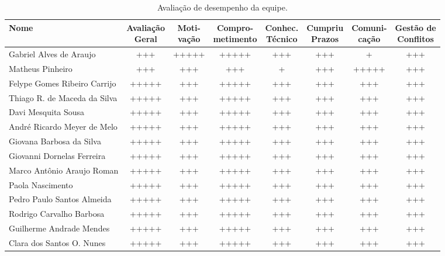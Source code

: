 \begin{landscape}
\begin{table}[htpb]
\centering
\small %
\caption{Avaliação de desempenho da equipe.}
\label{tab:avaliacao_equipe}
\begin{tabular}{|l|c|c|c|c|c|c|c|}
\hline
\textbf{Nome} & \makecell{\textbf{Avaliação} \\ \textbf{Geral}} & \makecell{\textbf{Moti-} \\ \textbf{vação}} & \makecell{\textbf{Compro-} \\ \textbf{metimento}} & \makecell{\textbf{Conhec.} \\ \textbf{Técnico}} & \makecell{\textbf{Cumpriu} \\ \textbf{Prazos}} & \makecell{\textbf{Comuni-} \\ \textbf{cação}} & \makecell{\textbf{Gestão de} \\ \textbf{Conflitos}} \\ \hline
Gabriel Alves de Araujo & +++ & +++++ & +++++ & +++ & +++ & + & +++ \\ \hline
Matheus Pinheiro  & +++ &  +++ & +++ & + & +++ & +++++ & +++ \\ \hline
Felype Gomes Ribeiro Carrijo  & +++++ & +++ &  +++++ & +++ & +++ & +++ & +++  \\ \hline
Thiago R. de Maceda da Silva & +++++ & +++ &  +++++ & +++ & +++ & +++ & +++  \\ \hline
Davi Mesquita Sousa & +++++ & +++ &  +++++ & +++ & +++ & +++ & +++  \\ \hline
André Ricardo Meyer de Melo & +++++ & +++ &  +++++ & +++ & +++ & +++ & +++  \\ \hline
Giovana Barbosa da Silva & +++++ & +++ &  +++++ & +++ & +++ & +++ & +++  \\ \hline
Giovanni Dornelas Ferreira & +++++ & +++ &  +++++ & +++ & +++ & +++ & +++  \\ \hline
Marco Antônio Araujo Roman & +++++ & +++ &  +++++ & +++ & +++ & +++ & +++  \\ \hline
Paola Nascimento & +++++ & +++ &  +++++ & +++ & +++ & +++ & +++  \\ \hline
Pedro Paulo Santos Almeida & +++++ & +++ &  +++++ & +++ & +++ & +++ & +++  \\ \hline
Rodrigo Carvalho Barbosa & +++++ & +++ &  +++++ & +++ & +++ & +++ & +++  \\ \hline
Guilherme Andrade Mendes & +++++ & +++ &  +++++ & +++ & +++ & +++ & +++  \\ \hline
Clara dos Santos O. Nunes & +++++ & +++ &  +++++ & +++ & +++ & +++ & +++  \\ \hline

\end{tabular}
\end{table}
\end{landscape}
